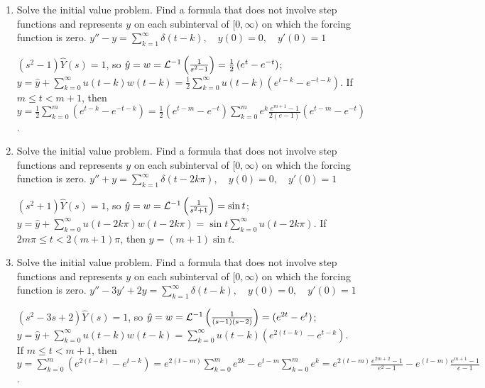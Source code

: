 \documentclass{ximera}
\begin{document}
\begin{problem}\label{exer:8.7.30}
\begin{enumerate}

\item Solve the initial value problem. Find a formula that
does not involve step functions and represents $y$  on each subinterval of $[0,\infty)$ on which the forcing function is zero.
$y''-y=\sum_{k=1}^\infty\delta(t-k), \quad  y(0)=0,\quad y'(0)=1$

\begin{solution}
$(s^2-1)\hat Y(s)=1$, so $\hat y=w={\cal L}^{-1}\left(\frac{1}{
s^2-1}\right)=\frac{1}{2}\left(e^t-e^{-t}\right)$;
$y=\hat y+\sum_{k=0}^\infty u(t-k)w(t-k)=
\frac{1}{2}\sum_{k=0}^\infty u(t-k)\left(e^{t-k}-e^{-t-k}\right)$.
If $m\le t< m+1$, then
$y=\frac{1}{2}\sum_{k=0}^m
\left(e^{t-k}-e^{-t-k}\right)=\frac{1}{2}(e^{t-m}-e^{-t})
\sum_{k=0}^m e^k
\frac{e^{m+1}-1}{2(e-1)}(e^{t-m}-e^{-t})$.
\end{solution}

\item Solve the initial value problem. Find a formula that
does not involve step functions and represents $y$  on each subinterval of $[0,\infty)$ on which the forcing function is zero.
$y''+y=\sum_{k=1}^\infty\delta(t-2k\pi), \quad  y(0)=0,\quad y'(0)=1$

\begin{solution}
$(s^2+1)\hat Y(s)=1$, so $\hat y=w={\cal L}^{-1}\left(\frac{1}{s^2+1}\right)=\sin t$;
$y=\hat y+\sum_{k=0}^\infty u(t-2k\pi)w(t-2k\pi)=
\sin t\sum_{k=0}^\infty u(t-2k\pi)$.
If $2m\pi\le t< 2(m+1)\pi$, then
$y=(m+1)\sin t$.
\end{solution}

\item Solve the initial value problem. Find a formula that
does not involve step functions and represents $y$  on each subinterval of $[0,\infty)$ on which the forcing function is zero.
$y''-3y'+2y=\sum_{k=1}^\infty\delta(t-k), \quad  y(0)=0,\quad y'(0)=1$

\begin{solution}
$(s^2-3s+2)\hat Y(s)=1$, so $\hat y=w={\cal L}^{-1}\left(\frac{1}{(s-1)(s-2)}\right)=(e^{2t}-e^t)$;
$y=\hat y+\sum_{k=0}^\infty u(t-k)w(t-k)=
\sum_{k=0}^\infty u(t-k)\left(e^{2(t-k)}-e^{t-k}\right)$.
If $m\le t< m+1$, then
$y=\sum_{k=0}^m
\left(e^{2(t-k)}-e^{t-k}\right)=
e^{2(t-m)}\sum_{k=0}^me^{2k}-e^{t-m}\sum_{k=0}^me^k=
e^{2(t-m)}\frac{e^{2m+2}-1}{e^2-1}-e^{(t-m)}\frac{e^{m+1}-1}{e-1}$.
\end{solution}


\end{enumerate}
\end{problem}
\end{document}
